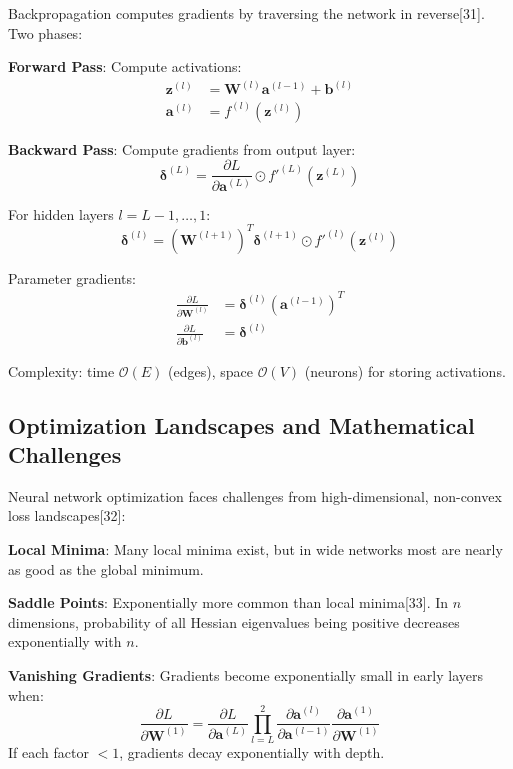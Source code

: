 \documentclass[11pt,a4paper]{report}
\begin{document}
Backpropagation computes gradients by traversing the network in reverse[31]. Two phases:

\textbf{Forward Pass}: Compute activations:
\begin{align}
\mathbf{z}^{(l)} &= \mathbf{W}^{(l)} \mathbf{a}^{(l-1)} + \mathbf{b}^{(l)} \\
\mathbf{a}^{(l)} &= f^{(l)}(\mathbf{z}^{(l)})
\end{align}

\textbf{Backward Pass}: Compute gradients from output layer:
\begin{equation}
\boldsymbol{\delta}^{(L)} = \frac{\partial L}{\partial \mathbf{a}^{(L)}} \odot f'^{(L)}(\mathbf{z}^{(L)})
\end{equation}

For hidden layers $l = L-1, \ldots, 1$:
\begin{equation}
\boldsymbol{\delta}^{(l)} = (\mathbf{W}^{(l+1)})^T \boldsymbol{\delta}^{(l+1)} \odot f'^{(l)}(\mathbf{z}^{(l)})
\end{equation}

Parameter gradients:
\begin{align}
\frac{\partial L}{\partial \mathbf{W}^{(l)}} &= \boldsymbol{\delta}^{(l)} (\mathbf{a}^{(l-1)})^T \\
\frac{\partial L}{\partial \mathbf{b}^{(l)}} &= \boldsymbol{\delta}^{(l)}
\end{align}

Complexity: time $\mathcal{O}(E)$ (edges), space $\mathcal{O}(V)$ (neurons) for storing activations.

\subsection{Optimization Landscapes and Mathematical Challenges}

Neural network optimization faces challenges from high-dimensional, non-convex loss landscapes[32]:

\textbf{Local Minima}: Many local minima exist, but in wide networks most are nearly as good as the global minimum.

\textbf{Saddle Points}: Exponentially more common than local minima[33]. In $n$ dimensions, probability of all Hessian eigenvalues being positive decreases exponentially with $n$.

\textbf{Vanishing Gradients}: Gradients become exponentially small in early layers when:
\begin{equation}
\frac{\partial L}{\partial \mathbf{W}^{(1)}} = \frac{\partial L}{\partial \mathbf{a}^{(L)}} \prod_{l=L}^{2} \frac{\partial \mathbf{a}^{(l)}}{\partial \mathbf{a}^{(l-1)}} \frac{\partial \mathbf{a}^{(1)}}{\partial \mathbf{W}^{(1)}}
\end{equation}
If each factor $< 1$, gradients decay exponentially with depth.
\end{document}
